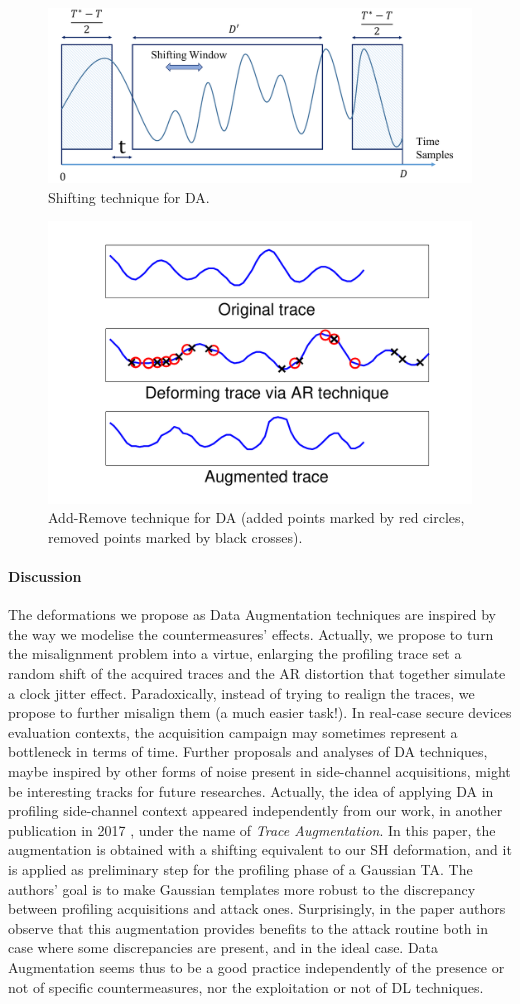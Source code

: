\begin{figure}[t]
\centering
\includegraphics[width=.5\textwidth]{../Figures/CHES2017/Shifting_window.pdf}
\caption{Shifting technique for DA.}\label{fig:SH}
\end{figure}

\begin{figure}[t]
\centering
\includegraphics[width=.5\textwidth]{../Figures/CHES2017/AR_example.pdf}
\caption{Add-Remove technique for DA (added points marked by red circles, removed points marked by black crosses).}\label{fig:AR}
\end{figure}

\paragraph*{Discussion}
The deformations we propose as Data Augmentation techniques are inspired by the way we modelise the countermeasures' effects. Actually, we propose to turn the misalignment problem into a virtue, enlarging the profiling trace set \via a random shift of the acquired traces and the AR distortion that together simulate a clock jitter effect. Paradoxically, instead of trying to realign the traces, we propose to further misalign them (a much easier task!). In real-case secure devices evaluation contexts, the acquisition campaign may sometimes represent a bottleneck in terms of time. Further proposals and analyses of  DA techniques, maybe inspired by other forms of noise present in side-channel acquisitions, might be interesting tracks for future researches. Actually, the idea of applying DA in profiling side-channel context appeared independently from our work, in another publication in 2017 \cite{pu2017trace}, under the name of \emph{Trace Augmentation}. In this paper, the augmentation is obtained with a shifting equivalent to our SH deformation, and it is applied as preliminary step for the profiling phase of a Gaussian TA. The authors' goal is to make Gaussian templates more robust to the discrepancy between profiling acquisitions and attack ones. Surprisingly, in the paper authors observe that this augmentation provides benefits to the attack routine both in case where some discrepancies are present, and in the ideal case. Data Augmentation seems thus to be a good practice independently of the presence or not of specific countermeasures, nor the exploitation or not of DL techniques.



